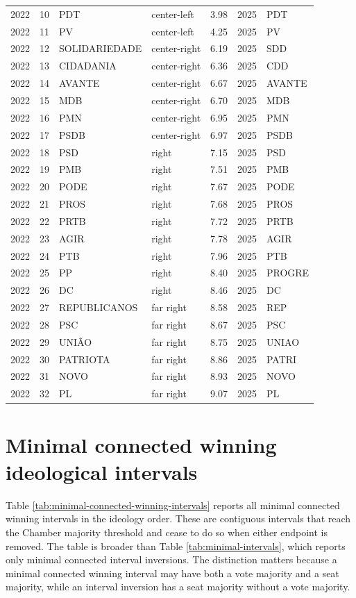 \documentclass[11pt]{article}
\newcommand{\RepoRoot}{/home/marcelo/Sync/Projects/electoral-inversion}%
\newcommand{\RepoRoot}{/home/marcelovmaciel/Sync/Projects/electoral_inversions}%
\newcommand{\ArtifactRoot}{\RepoRoot/processing/Processing/output/paper}
\begin{document}
\begin{longtable}{rrlllrl}
2022 & 10 & PDT & center-left & 3.98 & 2025 & PDT \\
2022 & 11 & PV & center-left & 4.25 & 2025 & PV \\
2022 & 12 & SOLIDARIEDADE & center-right & 6.19 & 2025 & SDD \\
2022 & 13 & CIDADANIA & center-right & 6.36 & 2025 & CDD \\
2022 & 14 & AVANTE & center-right & 6.67 & 2025 & AVANTE \\
2022 & 15 & MDB & center-right & 6.70 & 2025 & MDB \\
2022 & 16 & PMN & center-right & 6.95 & 2025 & PMN \\
2022 & 17 & PSDB & center-right & 6.97 & 2025 & PSDB \\
2022 & 18 & PSD & right & 7.15 & 2025 & PSD \\
2022 & 19 & PMB & right & 7.51 & 2025 & PMB \\
2022 & 20 & PODE & right & 7.67 & 2025 & PODE \\
2022 & 21 & PROS & right & 7.68 & 2025 & PROS \\
2022 & 22 & PRTB & right & 7.72 & 2025 & PRTB \\
2022 & 23 & AGIR & right & 7.78 & 2025 & AGIR \\
2022 & 24 & PTB & right & 7.96 & 2025 & PTB \\
2022 & 25 & PP & right & 8.40 & 2025 & PROGRE \\
2022 & 26 & DC & right & 8.46 & 2025 & DC \\
2022 & 27 & REPUBLICANOS & far right & 8.58 & 2025 & REP \\
2022 & 28 & PSC & far right & 8.67 & 2025 & PSC \\
2022 & 29 & UNIÃO & far right & 8.75 & 2025 & UNIAO \\
2022 & 30 & PATRIOTA & far right & 8.86 & 2025 & PATRI \\
2022 & 31 & NOVO & far right & 8.93 & 2025 & NOVO \\
2022 & 32 & PL & far right & 9.07 & 2025 & PL \\
\bottomrule
\end{longtable}

\section{Minimal connected winning ideological intervals}
\label{app:minimal-connected-winning}

Table \ref{tab:minimal-connected-winning-intervals} reports all
minimal connected winning intervals in the ideology order. These are
contiguous intervals that reach the Chamber majority threshold and cease to do
so when either endpoint is removed. The table is broader than Table
\ref{tab:minimal-intervals}, which reports only minimal connected interval
inversions. The distinction matters because a minimal connected winning interval
may have both a vote majority and a seat majority, while an interval inversion
has a seat majority without a vote majority.


\end{document}
